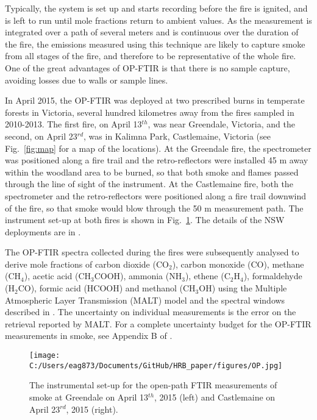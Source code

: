 \documentclass[acp, manuscript]{copernicus}
\begin{document}
Typically, the system is set up and starts recording before the fire is ignited, and is left to run until mole fractions return to ambient values. As the measurement is integrated over a path of several meters and is continuous over the duration of the fire, the emissions measured using this technique are likely to capture smoke from all stages of the fire, and therefore to be representative of the whole fire. One of the great advantages of OP-FTIR is that there is no sample capture, avoiding losses due to walls or sample lines. 

In April 2015, the OP-FTIR was deployed at two prescribed burns in temperate forests in Victoria, several hundred kilometres away from the fires sampled in 2010-2013. The first fire, on April 13$^{th}$, was near Greendale, Victoria, and the second, on April 23$^{rd}$, was in Kalimna Park, Castlemaine, Victoria (see Fig.~\ref{fig:map} for a map of the locations). At the Greendale fire, the spectrometer was positioned along a fire trail and the retro-reflectors were installed 45 m away within the woodland area to be burned, so that both smoke and flames passed through the line of sight of the instrument. At the Castlemaine fire, both the spectrometer and the retro-reflectors were positioned along a fire trail downwind of the fire, so that smoke would blow through the 50 m measurement path. The instrument set-up at both fires is shown in Fig.~\ref{fig:OP}. The details of the NSW deployments are in \citet{Paton-Walsh2014}. 

The OP-FTIR spectra collected during the fires were subsequently analysed to derive mole fractions of carbon dioxide (CO$_2$), carbon monoxide (CO), methane (CH$_4$), acetic acid (CH$_3$COOH), ammonia (NH$_3$), ethene (C$_2$H$_4$), formaldehyde (H$_2$CO), formic acid (HCOOH) and methanol (CH$_3$OH) using the Multiple Atmospheric Layer Transmission (MALT) model \citep{Griffith1996,Griffith2012} and the spectral windows described in \citet{Paton-Walsh2014}. The uncertainty on individual measurements is the error on the retrieval reported by MALT. For a complete uncertainty budget for the OP-FTIR measurements in smoke, see Appendix B of \citet{Paton-Walsh2014}.

\begin{figure}
  \texttt{[image: C:/Users/eag873/Documents/GitHub/HRB\_paper/figures/OP.jpg]}
  \caption{The instrumental set-up for the open-path FTIR measurements of smoke at Greendale on April 13$^{th}$, 2015 (left) and Castlemaine on April 23$^{rd}$, 2015 (right).}
  \label{fig:OP}
\end{figure}
\end{document}
